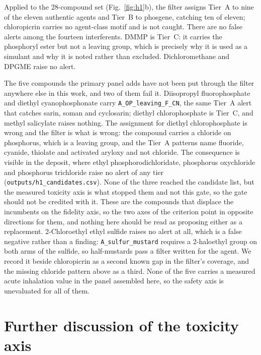 \documentclass[11pt,a4paper]{article}
\begin{document}
Applied to the 28-compound set (Fig.~\ref{fig:h1}b), the filter assigns Tier~A to nine of the eleven
authentic agents and Tier~B to phosgene, catching ten of eleven; chloropicrin
carries no agent-class motif and is not caught. There are no false alerts among
the fourteen interferents. DMMP is Tier~C: it carries the phosphoryl ester but
not a leaving group, which is precisely why it is used as a simulant and why it
is noted rather than excluded. Dichloromethane and DPGME raise no alert.

The five compounds the primary panel adds have not been put through the filter
anywhere else in this work, and two of them fail it. Diisopropyl
fluorophosphate and diethyl cyanophosphonate carry \texttt{A\_OP\_leaving\_F\_CN},
the same Tier~A alert that catches sarin, soman and cyclosarin; diethyl
chlorophosphate is Tier~C, and methyl
salicylate raises nothing. The assignment for diethyl chlorophosphate is wrong
and the filter is what is wrong: the compound carries a chloride on phosphorus,
which is a leaving group, and the Tier~A patterns name fluoride, cyanide,
thiolate and activated aryloxy and not chloride. The consequence is visible in
the deposit, where ethyl phosphorodichloridate, phosphorus oxychloride and
phosphorus trichloride raise no alert of any tier
(\texttt{outputs/h1\_candidates.csv}). None of the three reached the candidate
list, but the measured toxicity axis is what stopped them and not this gate, so
the gate should not be credited with it. These are the compounds that displace the incumbents
on the fidelity axis, so the two axes of the criterion point in opposite
directions for them, and nothing here should be read as proposing either as a
replacement. 2-Chloroethyl ethyl sulfide raises no alert at all, which is a
false negative rather than a finding: \texttt{A\_sulfur\_mustard} requires a
2-haloethyl group on both arms of the sulfide, so half-mustards pass a filter
written for the agent. We record it beside chloropicrin as a second known gap
in the filter's coverage, and the missing chloride pattern above as a third. None of the five carries a measured acute inhalation
value in the panel assembled here, so the safety axis is unevaluated for all
of them.


\section{Further discussion of the toxicity axis}
\label{disc:toxaxis}
\end{document}
